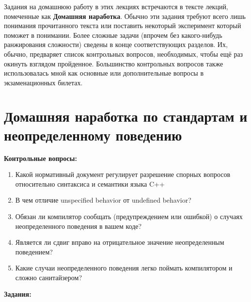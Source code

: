 \documentclass[a4paper,12pt,oneside]{book}
\begin{document}
Задания на домашнюю работу в этих лекциях встречаются в тексте лекций, помеченные как \textbf{Домашняя наработка}. Обычно эти задания требуют всего лишь понимания прочитанного текста или поставить некоторый эксперимент который поможет в понимании. Более сложные задачи (впрочем без какого-нибудь ранжирования сложности) сведены в конце соответствующих разделов. Их, обычно, предваряет список контрольных вопросов, необходимых, чтобы ещё раз окинуть взглядом пройденное. Большинство контрольных вопросов также использовалась мной как основные или дополнительные вопросы в экзаменационных билетах.

\pagebreak
\section{Домашняя наработка по стандартам и неопределенному поведению}\label{StandHomework}

\textbf{Контрольные вопросы:} 

\begin{enumerate}
\item Какой нормативный документ регулирует разрешение спорных вопросов относительно синтаксиса и семантики языка C++
\item В чем отличие unspecified behavior от undefined behavior?
\item Обязан ли компилятор сообщать (предупреждением или ошибкой) о случаях неопределенного поведения в вашем коде?
\item Является ли сдвиг вправо на отрицательное значение неопределенным поведением?
\item Какие случаи неопределенного поведения легко поймать компилятором и сложно санитайзером? 
\end{enumerate}

\textbf{Задания:} 
\end{document}
